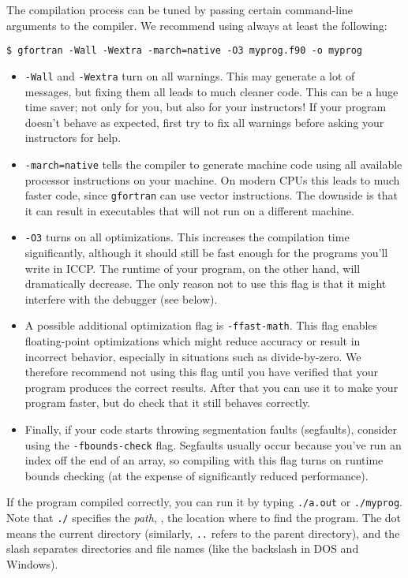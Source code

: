 The compilation process can be tuned by passing certain command-line arguments to the compiler.
We recommend using always at least the following:
\begin{verbatim}
$ gfortran -Wall -Wextra -march=native -O3 myprog.f90 -o myprog
\end{verbatim}
\begin{itemize}
  \item \texttt{-Wall} and \texttt{-Wextra} turn on all warnings.
    This may generate a lot of messages, but fixing them all leads to much cleaner code.
    This can be a huge time saver; not only for you, but also for your instructors!
    If your program doesn't behave as expected, first try to fix all warnings before asking your instructors for help.
  \item \texttt{-march=native} tells the compiler to generate machine code using all available processor instructions on your machine. 
    On modern CPUs this leads to much faster code, since \texttt{gfortran} can use vector instructions.
    The downside is that it can result in executables that will not run on a different machine.
  \item \texttt{-O3} turns on all optimizations.
    This increases the compilation time significantly, although it should still be fast enough for the programs you'll write in ICCP.
    The runtime of your program, on the other hand, will dramatically decrease.
    The only reason not to use this flag is that it might interfere with the debugger (see below).
  \item A possible additional optimization flag is \texttt{-ffast-math}.
    This flag enables floating-point optimizations which might reduce accuracy or result in incorrect behavior, especially in situations such as divide-by-zero.
    We therefore recommend not using this flag until you have verified that your program produces the correct results.
    After that you can use it to make your program faster, but do check that it still behaves correctly.
  \item Finally, if your code starts throwing segmentation faults (segfaults), consider using the \texttt{-fbounds-check} flag.
    Segfaults usually occur because you've run an index off the end of an array, so compiling with this flag turns on runtime bounds checking (at the expense of significantly reduced performance).
\end{itemize}
If the program compiled correctly, you can run it by typing \texttt{./a.out} or \texttt{./myprog}.
Note that \texttt{./} specifies the \emph{path}, \ie, the location where to find the program.
The dot means the current directory (similarly, \texttt{..} refers to the parent directory), and the slash separates directories and file names (like the backslash in DOS and Windows).


